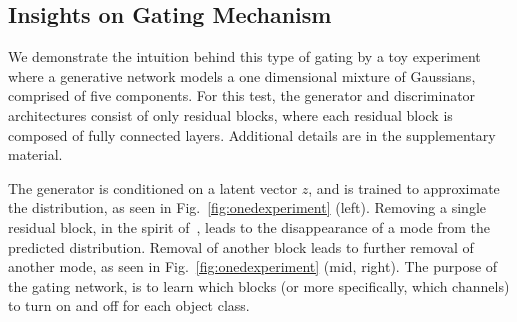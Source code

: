 \subsection{Insights on Gating Mechanism}
We demonstrate the intuition behind this type of gating by a toy experiment  where a generative network models a one dimensional mixture of Gaussians, comprised of five components. 
For this test, the generator and discriminator architectures consist of only residual blocks, where each residual block is composed of fully connected layers. 
Additional details are in the supplementary material. 

The generator is conditioned on a latent vector $z$, and is trained to approximate the distribution, as seen in Fig.~\ref{fig:onedexperiment} (left). 
Removing a single residual block, in the spirit of~\cite{veit2016residual}, leads to the disappearance of a mode from the predicted distribution. 
Removal of another block leads to further removal of another mode, as seen in Fig.~\ref{fig:onedexperiment}  (mid, right). 
The purpose of the gating network, is to learn which blocks (or more specifically, which channels) to turn on and off for each object class.





